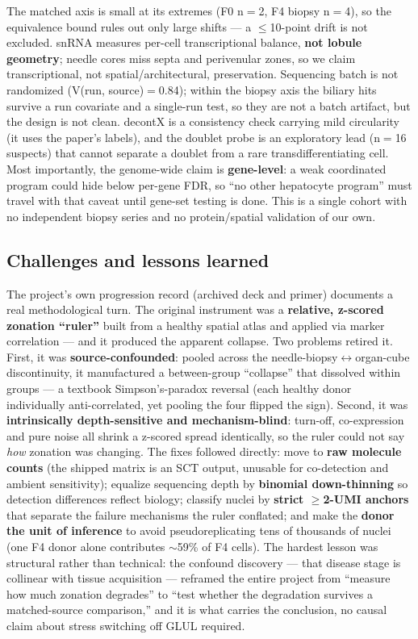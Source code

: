 \documentclass[11pt,a4paper]{article}
\begin{document}
The matched axis is small at its extremes (F0 n$=$2, F4 biopsy n$=$4), so the equivalence bound rules out only large shifts --- a $\le$10-point drift is not excluded. snRNA measures per-cell transcriptional balance, \textbf{not lobule geometry}; needle cores miss septa and perivenular zones, so we claim transcriptional, not spatial/architectural, preservation. Sequencing batch is not randomized (V(run, source)$=$0.84); within the biopsy axis the biliary hits survive a run covariate and a single-run test, so they are not a batch artifact, but the design is not clean. decontX is a consistency check carrying mild circularity (it uses the paper's labels), and the doublet probe is an exploratory lead (n$=$16 suspects) that cannot separate a doublet from a rare transdifferentiating cell. Most importantly, the genome-wide claim is \textbf{gene-level}: a weak coordinated program could hide below per-gene FDR, so ``no other hepatocyte program'' must travel with that caveat until gene-set testing is done. This is a single cohort with no independent biopsy series and no protein/spatial validation of our own.

\subsection{Challenges and lessons learned}

The project's own progression record (archived deck and primer) documents a real methodological turn. The original instrument was a \textbf{relative, z-scored zonation ``ruler''} built from a healthy spatial atlas and applied via marker correlation --- and it produced the apparent collapse. Two problems retired it. First, it was \textbf{source-confounded}: pooled across the needle-biopsy$\leftrightarrow$organ-cube discontinuity, it manufactured a between-group ``collapse'' that dissolved within groups --- a textbook Simpson's-paradox reversal (each healthy donor individually anti-correlated, yet pooling the four flipped the sign). Second, it was \textbf{intrinsically depth-sensitive and mechanism-blind}: turn-off, co-expression and pure noise all shrink a z-scored spread identically, so the ruler could not say \emph{how} zonation was changing. The fixes followed directly: move to \textbf{raw molecule counts} (the shipped matrix is an SCT output, unusable for co-detection and ambient sensitivity); equalize sequencing depth by \textbf{binomial down-thinning} so detection differences reflect biology; classify nuclei by \textbf{strict $\ge$2-UMI anchors} that separate the failure mechanisms the ruler conflated; and make the \textbf{donor the unit of inference} to avoid pseudoreplicating tens of thousands of nuclei (one F4 donor alone contributes $\sim$59\% of F4 cells). The hardest lesson was structural rather than technical: the confound discovery --- that disease stage is collinear with tissue acquisition --- reframed the entire project from ``measure how much zonation degrades'' to ``test whether the degradation survives a matched-source comparison,'' and it is what carries the conclusion, no causal claim about stress switching off GLUL required.
\end{document}
